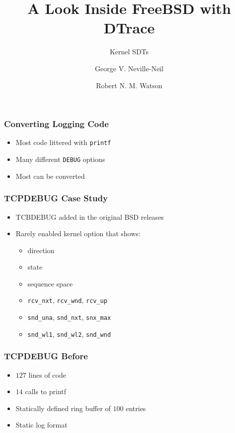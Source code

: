 \documentclass[pdftex]{beamer}
\begin{document}

\title{A Look Inside FreeBSD with DTrace}
\subtitle{Kernel SDTs}
\author[shortname]{George V. Neville-Neil \and Robert N. M. Watson}

\begin{frame}
  \titlepage
\end{frame}

\begin{frame}[fragile]
  \frametitle{Converting Logging Code}
  \begin{itemize}
  \item Most code littered with \verb|printf|
  \item Many different \verb|DEBUG| options
  \item  Most can be converted
  \end{itemize}
\end{frame}

\begin{frame}[fragile]
  \frametitle{TCPDEBUG Case Study}
  \begin{itemize}
  \item TCBDEBUG added in the original BSD releases
  \item Rarely enabled kernel option that shows:
    \begin{itemize}
    \item direction
    \item state
    \item sequence space
    \item \verb|rcv_nxt|, \verb|rcv_wnd|, \verb|rcv_up|
    \item \verb|snd_una|, \verb|snd_nxt|, \verb|snx_max|
    \item \verb|snd_wl1|, \verb|snd_wl2|, \verb|snd_wnd|
    \end{itemize}
  \end{itemize}
\end{frame}

\begin{frame}
  \frametitle{TCPDEBUG Before}
  \begin{itemize}
  \item $127$ lines of code
  \item $14$ calls to printf
  \item Statically defined ring buffer of $100$ entries
  \item Static log format
  \end{itemize}
\end{frame}
\end{document}
